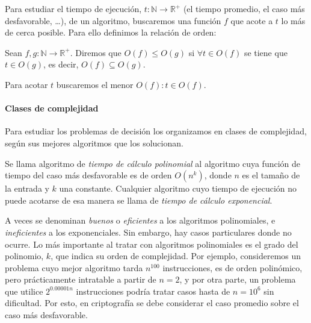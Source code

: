 \hfil

Para estudiar el tiempo de ejecución, $t : \mathbb{N} \rightarrow \mathbb{R}^+$ (el tiempo promedio, el caso más desfavorable, \dots), de un algoritmo, buscaremos una función $f$ que acote a $t$ lo más de cerca posible. Para ello definimos la relación de orden:

\begin{definition}
	Sean $f, g : \mathbb{N} \rightarrow \mathbb{R}^+$.
	Diremos que  $O(f) \leq O(g)$ si $\forall t \in O(f)$ se tiene que $t \in O(g)$, es decir,  $O(f) \subseteq O(g)$.
\end{definition}

Para acotar $t$ buscaremos el menor $O(f) : t\in O(f)$.


\hfil 

\paragraph{Clases de complejidad} Para estudiar los problemas de decisión los organizamos en clases de complejidad, según sus mejores algoritmos que los solucionan.


\begin{definition}
	Se llama algoritmo de \textit{tiempo de cálculo polinomial} al algoritmo cuya función de tiempo del caso más desfavorable es de orden $O(n^k)$, donde $n$ es el tamaño de la entrada y $k$ una constante. Cualquier algoritmo cuyo tiempo de ejecución no puede acotarse de esa manera se llama de \textit{tiempo de cálculo exponencial}.
\end{definition}

A veces se denominan \textit{buenos} o \textit{eficientes} a los algoritmos polinomiales, e \textit{ineficientes} a los exponenciales. Sin embargo, hay casos particulares donde no ocurre. Lo más importante al tratar con algoritmos polinomiales es el grado del polinomio, $k$, que indica su orden de complejidad. Por ejemplo, consideremos un problema cuyo mejor algoritmo tarda $n^{100}$ instrucciones, es de orden polinómico, pero prácticamente intratable a partir de $n=2$, y por otra parte, un problema que utilice $2^{0.00001n}$ instrucciones podría tratar casos hasta de $n=10^6$ sin dificultad.
Por esto, en criptografía se debe considerar el caso promedio sobre el caso más desfavorable.


